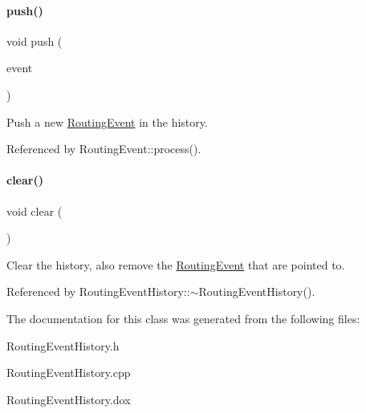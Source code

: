 \paragraph{\texorpdfstring{push()}{push()}}
{\footnotesize\ttfamily void push (\begin{DoxyParamCaption}\item[{\mbox{\hyperlink{classKite_1_1RoutingEvent}{Routing\+Event}} $\ast$}]{event }\end{DoxyParamCaption})}

Push a new \mbox{\hyperlink{classKite_1_1RoutingEvent}{Routing\+Event}} in the history. 

Referenced by Routing\+Event\+::process().

\mbox{\label{classKite_1_1RoutingEventHistory_ac8bb3912a3ce86b15842e79d0b421204}} 
\paragraph{\texorpdfstring{clear()}{clear()}}
{\footnotesize\ttfamily void clear (\begin{DoxyParamCaption}{ }\end{DoxyParamCaption})}

Clear the history, also remove the \mbox{\hyperlink{classKite_1_1RoutingEvent}{Routing\+Event}} that are pointed to. 

Referenced by Routing\+Event\+History\+::$\sim$\+Routing\+Event\+History().



The documentation for this class was generated from the following files\+:\begin{DoxyCompactItemize}
\item 
Routing\+Event\+History.\+h\item 
Routing\+Event\+History.\+cpp\item 
Routing\+Event\+History.\+dox\end{DoxyCompactItemize}
